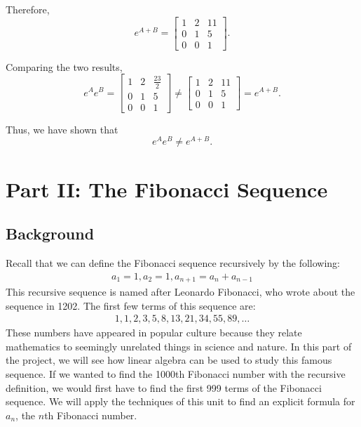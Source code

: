 \documentclass{article}
\begin{document}
\begin{enumerate}
        Therefore,
        \[
          e^{A+B}=
          \begin{bmatrix}
            1 & 2 & 11 \\
            0 & 1 & 5  \\
            0 & 0 & 1
          \end{bmatrix}.
        \]

        Comparing the two results,
        \[
          e^Ae^B=
          \begin{bmatrix}
            1 & 2 & \frac{23}{2} \\
            0 & 1 & 5            \\
            0 & 0 & 1
          \end{bmatrix}
          \neq
          \begin{bmatrix}
            1 & 2 & 11 \\
            0 & 1 & 5  \\
            0 & 0 & 1
          \end{bmatrix}
          =e^{A+B}.
        \]

        Thus, we have shown that
        \[
          \boxed{e^Ae^B\neq e^{A+B}}.
        \]

\end{enumerate}

\section{Part II: The Fibonacci Sequence}

\subsection{Background}

Recall that we can define the Fibonacci sequence recursively by the following:
\begin{align*}
  a_1 = 1, a_2 = 1, a_{n+1} = a_n + a_{n-1}
\end{align*}
This recursive sequence is named after Leonardo Fibonacci, who wrote about the sequence in 1202. The first few terms of this sequence are:
\begin{align*}
  1, 1, 2, 3, 5, 8, 13, 21, 34, 55, 89, \ldots
\end{align*}
These numbers have appeared in popular culture because they relate mathematics to seemingly unrelated things in science and nature. In this part of the project, we will see how linear algebra can be used to study this famous sequence. If we wanted to find the 1000th Fibonacci number with the recursive definition, we would first have to find the first 999 terms of the Fibonacci sequence. We will apply the techniques of this unit to find an explicit formula for $a_n$, the $n$th Fibonacci number.
\end{document}
